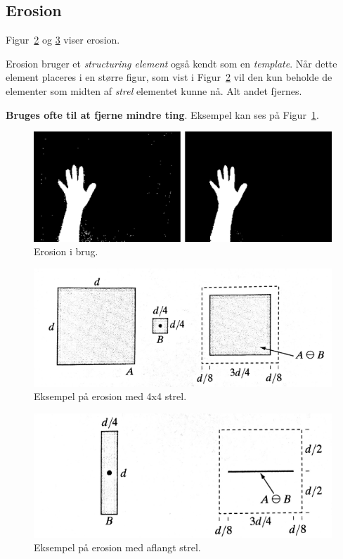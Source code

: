 \subsection{Erosion}
Figur~\ref{fig:erosion1} og \ref{fig:erosion2} viser erosion.

Erosion bruger et \textit{structuring element} også kendt som en \textit{template}. Når dette element placeres i en større figur, som vist i Figur~\ref{fig:erosion1} vil den kun beholde de elementer som midten af \textit{strel} elementet kunne nå. Alt andet fjernes.

\textbf{Bruges ofte til at fjerne mindre ting}. Eksempel kan ses på Figur~\ref{fig:erosion-in-use}.

\begin{figure}[H]
	\centering
	\includegraphics[width=0.8\linewidth]{figs/spm09/erosion-in-use}
	\caption{Erosion i brug.}
	\label{fig:erosion-in-use}
\end{figure}

\begin{figure}[H]
	\centering
	\includegraphics[width=0.7\linewidth]{figs/spm09/erosion1}
	\caption{Eksempel på erosion med 4x4 strel.}
	\label{fig:erosion1}
\end{figure}

\begin{figure}[H]
	\centering
	\includegraphics[width=0.7\linewidth]{figs/spm09/erosion2}
	\caption{Eksempel på erosion med aflangt strel.}
	\label{fig:erosion2}
\end{figure}

